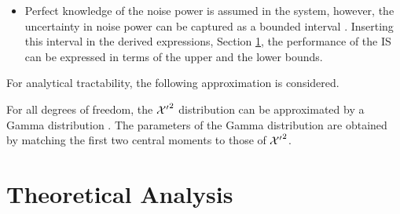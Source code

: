 \begin{itemize}
\item Perfect knowledge of the noise power is assumed in the system, however, the uncertainty in noise power can be captured as a bounded interval \cite{Tan08}. Inserting this interval in the derived expressions,  Section \ref{sec_IS:ana}, the performance of the IS can be expressed in terms of the upper and the lower bounds. 
\end{itemize}
For analytical tractability, the following approximation is considered.
\begin{approxi} \label{ap:ap1}
\normalfont
For all degrees of freedom, the $\ncchi2$ distribution can be approximated by a Gamma distribution \cite{abramo}. The parameters of the Gamma distribution are obtained by matching the first two central moments to those of $\ncchi2$.
\end{approxi}


\section{Theoretical Analysis} \label{sec_IS:ana}


